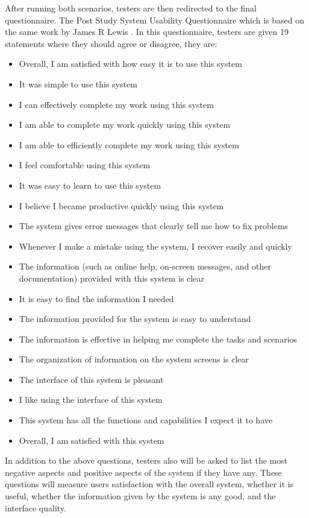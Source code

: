 After running both scenarios, testers are then redirected to the final questionnaire. The Post Study System Usability Questionnaire which is based on the same work by James R Lewis \citep{lewis1995ibm}. In this questionnaire, testers are given 19 statements where they should agree or disagree, they are:
\begin{itemize}
	\item Overall, I am satisfied with how easy it is to use this system
	\item It was simple to use this system
	\item I can effectively complete my work using this system 
	\item I am able to complete my work quickly using this system
	\item I am able to efficiently complete my work using this system
	\item I feel comfortable using this system
	\item It was easy to learn to use this system
	\item I believe I became productive quickly using this system
	\item The system gives error messages that clearly tell me how to fix problems
	\item Whenever I make a mistake using the system, I recover easily and quickly
	\item The information (such as online help, on-screen messages, and other documentation) provided with this system is clear
	\item It is easy to find the information I needed
	\item The information provided for the system is easy to understand
	\item The information is effective in helping me complete the tasks and scenarios 
	\item The organization of information on the system screens is clear
	\item The interface of this system is pleasant
	\item I like using the interface of this system
	\item This system has all the functions and capabilities I expect it to have 
	\item Overall, I am satisfied with this system
\end{itemize}

In addition to the above questions, testers also will be asked to list the most negative aspects and positive aspects of the system if they have any. These questions will measure users satisfaction with the overall system, whether it is useful, whether the information given by the system is any good, and the interface quality.

